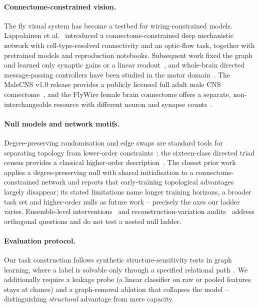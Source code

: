 \documentclass[10pt,twocolumn,letterpaper]{article}
\begin{document}
\paragraph{Connectome-constrained vision.}
The fly visual system has become a testbed for wiring-constrained models.
Lappalainen et al.~\cite{lappalainen2024} introduced a connectome-constrained
deep mechanistic network with cell-type-resolved connectivity and an
optic-flow task, together with pretrained models and reproduction notebooks.
Subsequent work fixed the graph and learned only synaptic gains or a linear
readout~\cite{structurealone2026}, and whole-brain
directed message-passing controllers have been studied in the motor
domain~\cite{flygm2026}. The MaleCNS v1.0 release provides a publicly
licensed full adult male CNS connectome~\cite{malecns2026}, and the FlyWire
female brain connectome offers a separate, non-interchangeable resource
with different neuron and synapse counts~\cite{dorkenwald2024}.

\paragraph{Null models and network motifs.}
Degree-preserving randomisation and edge swaps are standard tools for
separating topology from lower-order
constraints~\cite{maslov2002,milo2002}; the sixteen-class directed triad
census provides a classical higher-order description~\cite{wasserman1994,
hagberg2008}. The closest prior work~\cite{toposens2026} applies a
degree-preserving null with shared initialisation to a connectome-constrained
network and reports that early-training topological advantages largely
disappear; its stated limitations name longer training horizons, a broader
task set and higher-order nulls as future work -- precisely the axes our
ladder varies. Ensemble-level interventions~\cite{flyhack2026} and
reconstruction-variation audits~\cite{reconvar2026} address orthogonal
questions and do not test a nested null ladder.

\paragraph{Evaluation protocol.}
Our task construction follows synthetic structure-sensitivity tests in graph
learning, where a label is solvable only through a specified relational
path~\cite{kipf2017,xu2019}. We additionally require a leakage probe (a linear
classifier on raw or pooled features stays at chance) and a graph-removal
ablation that collapses the model -- distinguishing \emph{structural}
advantage from mere capacity.
\end{document}
